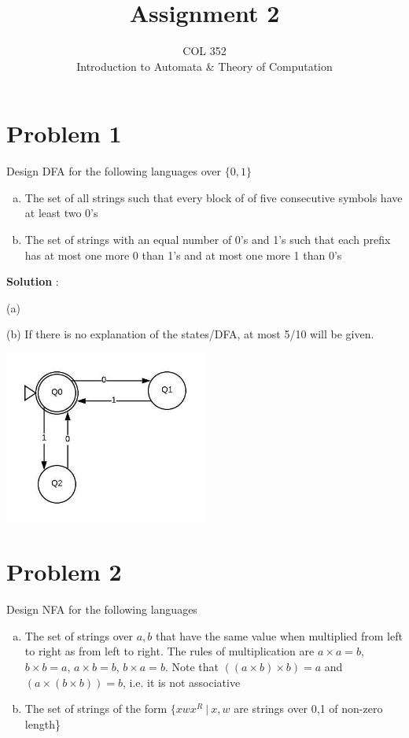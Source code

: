 \documentclass{article}
\title{Assignment 2}
\author{COL 352\\
    Introduction to Automata \& 
    Theory of Computation}
\date{}
\begin{document}
    \maketitle
    
    \section*{Problem 1} Design DFA for the following languages over $\{0, 1\}$
    \begin{enumerate}[(a)]
        \item The set of all strings such that every block of of five consecutive symbols have at least two 0’s
        \item The set of strings with an equal number of 0’s and 1’s such that each prefix has at most one more 0 than
1’s and at most one more 1 than 0’s
    \end{enumerate}
    
    \textbf{Solution} : 
    
    (a)
    
    (b) If there is no explanation of the states/DFA, at most 5/10 will be given.
    \begin{center}
        \includegraphics[width=0.5\textwidth]{Images/a2-q1-2.jpeg}
    \end{center}
    
    
    
    \section*{Problem 2} Design NFA for the following languages
    \begin{enumerate}[(a)]
        \item The set of strings over ${a, b}$ that have the same value when multiplied from left to right as from left to right. The rules of multiplication are $a \times a = b$, $b \times b = a$, $a \times b = b$, $b \times a = b$. Note that $((a \times b) \times b) = a$ and $(a \times (b \times b)) = b$, i.e. it is not associative
        \item The set of strings of the form $\{xwx^R ~|~ x, w$ are strings over 0,1 of non-zero length\}
    \end{enumerate}
    
\end{document}
